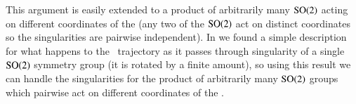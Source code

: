 This argument is easily extended to a product of arbitrarily many
$\textrm{SO}(2)$ acting on different coordinates of the {\statesp} (any two of
the $\textrm{SO}(2)$ act on distinct coordinates so the singularities are
pairwise independent). In  we found a simple
description for what happens to the \reducedsp\ trajectory as it passes
through singularity of a single $\textrm{SO}(2)$ symmetry group (it is rotated
by a finite amount), so using this result we can handle the singularities
for the product of arbitrarily many $\textrm{SO}(2)$ groups which pairwise act
on different coordinates of the {\statesp}.
